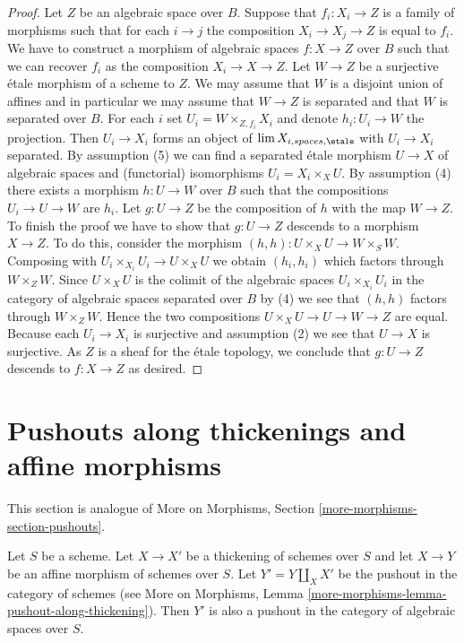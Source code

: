 \begin{proof}
Let $Z$ be an algebraic space over $B$. Suppose that $f_i : X_i \to Z$ is
a family of morphisms such that for each $i \to j$ the composition
$X_i \to X_j \to Z$ is equal to $f_i$. We have to construct a morphism
of algebraic spaces $f : X \to Z$ over $B$ such that we can recover $f_i$ as
the composition $X_i \to X \to Z$. Let $W \to Z$ be a surjective
\'etale morphism of a scheme to $Z$. We may assume that $W$ is a
disjoint union of affines and in particular we may assume that
$W \to Z$ is separated and that $W$ is separated over $B$. For each $i$ set
$U_i = W \times_{Z, f_i} X_i$ and denote $h_i : U_i \to W$ the projection.
Then $U_i \to X_i$ forms an object of $\lim X_{i, spaces, \etale}$
with $U_i \to X_i$ separated. By
assumption (5) we can find a separated \'etale morphism $U \to X$
of algebraic spaces and (functorial) isomorphisms $U_i = X_i \times_X U$.
By assumption (4) there exists a morphism $h : U \to W$ over $B$
such that the compositions $U_i \to U \to W$ are $h_i$.
Let $g : U \to Z$ be the composition of $h$ with the map $W \to Z$. To
finish the proof we have to show that $g : U \to Z$
descends to a morphism $X \to Z$. To do this, consider the morphism
$(h, h) : U \times_X U \to W \times_S W$.
Composing with $U_i \times_{X_i} U_i \to U \times_X U$ we obtain
$(h_i, h_i)$ which factors through $W \times_Z W$. Since $U \times_X U$
is the colimit of the algebraic spaces $U_i \times_{X_i} U_i$
in the category of algebraic spaces separated over $B$ by (4) we see
that $(h, h)$ factors through $W \times_Z W$. Hence the two compositions
$U \times_X U \to U \to W \to Z$ are equal. Because each $U_i \to X_i$ is
surjective and assumption (2) we see that $U \to X$ is surjective.
As $Z$ is a sheaf for the \'etale topology, we conclude that
$g : U \to Z$ descends to $f : X \to Z$ as desired.
\end{proof}





\section{Pushouts along thickenings and affine morphisms}
\label{section-pushouts}

\noindent
This section is analogue of
More on Morphisms, Section \ref{more-morphisms-section-pushouts}.

\begin{lemma}
\label{lemma-pushout-along-thickening-schemes}
Let $S$ be a scheme. Let $X \to X'$ be a thickening of schemes
over $S$ and let $X \to Y$ be an affine morphism of schemes over $S$.
Let $Y' = Y \amalg_X X'$ be the pushout in the category of schemes (see
More on Morphisms, Lemma \ref{more-morphisms-lemma-pushout-along-thickening}).
Then $Y'$ is also a pushout in the category of algebraic spaces over $S$.
\end{lemma}

